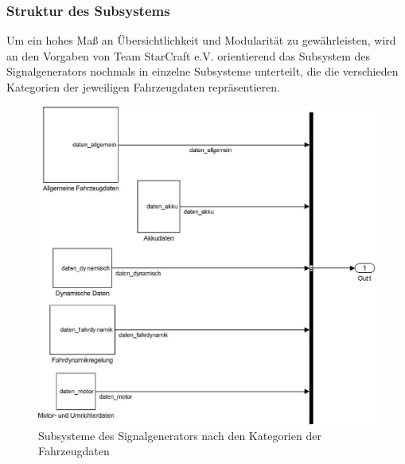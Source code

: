 \documentclass[fontsize = 12pt, paper = a4]{scrreprt}
\begin{document}
\subsubsection{Struktur des Subsystems}

Um ein hohes Maß an Übersichtlichkeit und Modularität zu gewährleisten, wird an den Vorgaben von Team StarCraft e.V. orientierend das Subsystem des Signalgenerators nochmals in einzelne Subsysteme unterteilt, die die verschieden Kategorien der jeweiligen Fahrzeugdaten repräsentieren. 

\begin{figure}[h]
\centering
\includegraphics[scale = 0.8]{signalgen}
\caption{Subsysteme des Signalgenerators nach den Kategorien der Fahrzeugdaten}
\end{figure}
\end{document}
